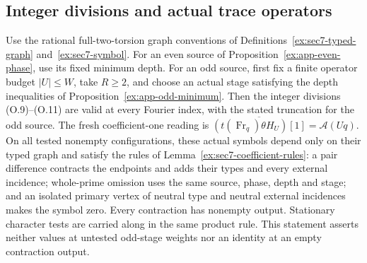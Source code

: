 \subsection{Integer divisions and actual trace operators}
\begin{proposition}\label{ex:app-coefficient-rules}
Use the rational full-two-torsion graph conventions of
Definitions~\ref{ex:sec7-typed-graph} and~\ref{ex:sec7-symbol}.
For an even source of Proposition~\ref{ex:app-even-phase}, use its
fixed minimum depth. For an odd source, first fix a finite operator
budget $|U|\le W$, take $R\ge2$, and choose an actual stage satisfying
the depth inequalities of Proposition~\ref{ex:app-odd-minimum}.
Then the integer divisions (O.9)--(O.11) are valid at every Fourier
index, with the stated truncation for the odd source.
The fresh coefficient-one reading is
$\overline{(t(\operatorname{Fr}_q)\theta H_U)[1]}=\mathcal A(Uq)$.
On all tested nonempty configurations, these actual symbols depend
only on their typed graph and satisfy the rules of
Lemma~\ref{ex:sec7-coefficient-rules}: a pair difference
contracts the endpoints and adds their types and every external
incidence; whole-prime omission uses the same source, phase, depth
and stage; and an isolated primary vertex of neutral type and
neutral external incidences makes the symbol zero.
Every contraction has nonempty output. Stationary character tests
are carried along in the same product rule. This statement asserts
neither values at untested odd-stage weights nor an identity at an
empty contraction output.
\end{proposition}
